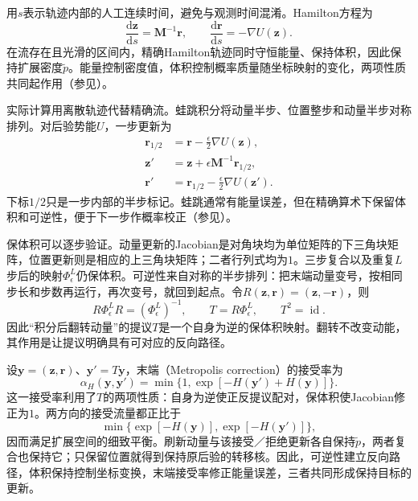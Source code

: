用$s$表示轨迹内部的人工连续时间，避免与观测时间混淆。Hamilton方程为
\begin{equation}
  \frac{\mathrm{d}\bm{z}}{\mathrm{d}s}=\bm{M}^{-1}\bm{r},
  \qquad
  \frac{\mathrm{d}\bm{r}}{\mathrm{d}s}=-\nabla U(\bm{z}).
  \label{eq:pgm-sampling-hamilton-equations}
\end{equation}
在流存在且光滑的区间内，精确Hamilton轨迹同时守恒能量、保持体积，因此保持扩展密度$\widetilde p$。能量控制密度值，体积控制概率质量随坐标映射的变化，两项性质共同起作用（参见）。

实际计算用离散轨迹代替精确流。蛙跳积分将动量半步、位置整步和动量半步对称排列。对后验势能$U$，一步更新为
\begin{equation}
  \begin{aligned}
    \bm{r}_{1/2}&=\bm{r}-\frac{\epsilon}{2}\nabla U(\bm{z}),\\
    \bm{z}'&=\bm{z}+\epsilon\bm{M}^{-1}\bm{r}_{1/2},\\
    \bm{r}'&=\bm{r}_{1/2}-\frac{\epsilon}{2}\nabla U(\bm{z}').
  \end{aligned}
  \label{eq:pgm-sampling-leapfrog}
\end{equation}
下标$1/2$只是一步内部的半步标记。蛙跳通常有能量误差，但在精确算术下保留体积和可逆性，便于下一步作概率校正（参见）。

保体积可以逐步验证。动量更新的Jacobian是对角块均为单位矩阵的下三角块矩阵，位置更新则是相应的上三角块矩阵；二者行列式均为$1$。三步复合以及重复$L$步后的映射$\Phi_{\epsilon}^{L}$仍保体积。可逆性来自对称的半步排列：把末端动量变号，按相同步长和步数再运行，再次变号，就回到起点。令$R(\bm{z},\bm{r})=(\bm{z},-\bm{r})$，则
\begin{equation}
  R\Phi_{\epsilon}^{L}R=(\Phi_{\epsilon}^{L})^{-1},
  \qquad
  T=R\Phi_{\epsilon}^{L},\qquad T^2=\operatorname{id}.
  \label{eq:pgm-sampling-hmc-reversibility}
\end{equation}
因此“积分后翻转动量”的提议$T$是一个自身为逆的保体积映射。翻转不改变动能，其作用是让提议明确具有可对应的反向路径。

设$\bm{y}=(\bm{z},\bm{r})$、$\bm{y}'=T\bm{y}$，末端（Metropolis correction）的接受率为
\begin{equation}
  \alpha_H(\bm{y},\bm{y}')
    =\min\{1,\exp[-H(\bm{y}')+H(\bm{y})]\}.
  \label{eq:pgm-sampling-hmc-acceptance}
\end{equation}
这一接受率利用了$T$的两项性质：自身为逆使正反提议配对，保体积使Jacobian修正为$1$。两方向的接受流量都正比于
\[
  \min\bigl\{\exp[-H(\bm{y})],\exp[-H(\bm{y}')]\bigr\},
\]
因而满足扩展空间的细致平衡。刷新动量与该接受／拒绝更新各自保持$\widetilde p$，两者复合也保持它；只保留位置就得到保持原后验的转移核。因此，可逆性建立反向路径，体积保持控制坐标变换，末端接受率修正能量误差，三者共同形成保持目标的更新。

